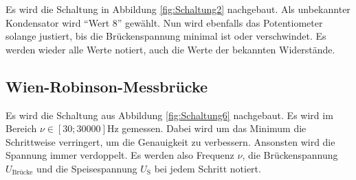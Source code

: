 Es wird die Schaltung in Abbildung \ref{fig:Schaltung2} nachgebaut.
Als unbekannter Kondensator wird \enquote{Wert 8} gewählt.
Nun wird ebenfalls das Potentiometer solange justiert, bis die Brückenspannung minimal ist oder verschwindet.
Es werden wieder alle Werte notiert, auch die Werte der bekannten Widerstände.

\subsection{Wien-Robinson-Messbrücke}

Es wird die Schaltung aus Abbildung \ref{fig:Schaltung6} nachgebaut.
Es wird im Bereich $\nu \in \left[ 30 ;30000 \right] \si\hertz $ gemessen.
Dabei wird um das Minimum die Schrittweise verringert, um die Genauigkeit zu verbessern.
Ansonsten wird die Spannung immer verdoppelt.
Es werden also Frequenz $\nu$, die Brückenspannung $U_\text{Brücke}$ und die Speisespannung $U_\text{S}$
bei jedem Schritt notiert.